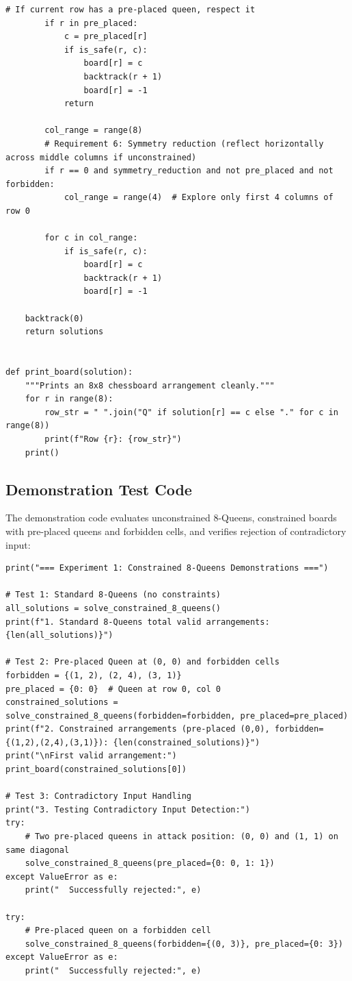 \documentclass[12pt]{article}
\begin{document}
\begin{lstlisting}[style=code]
        # If current row has a pre-placed queen, respect it
        if r in pre_placed:
            c = pre_placed[r]
            if is_safe(r, c):
                board[r] = c
                backtrack(r + 1)
                board[r] = -1
            return

        col_range = range(8)
        # Requirement 6: Symmetry reduction (reflect horizontally across middle columns if unconstrained)
        if r == 0 and symmetry_reduction and not pre_placed and not forbidden:
            col_range = range(4)  # Explore only first 4 columns of row 0

        for c in col_range:
            if is_safe(r, c):
                board[r] = c
                backtrack(r + 1)
                board[r] = -1

    backtrack(0)
    return solutions


def print_board(solution):
    """Prints an 8x8 chessboard arrangement cleanly."""
    for r in range(8):
        row_str = " ".join("Q" if solution[r] == c else "." for c in range(8))
        print(f"Row {r}: {row_str}")
    print()\end{lstlisting}

\subsection{Demonstration Test Code}
The demonstration code evaluates unconstrained 8-Queens, constrained boards with pre-placed queens and forbidden cells, and verifies rejection of contradictory input:

\begin{lstlisting}[style=code]
print("=== Experiment 1: Constrained 8-Queens Demonstrations ===")

# Test 1: Standard 8-Queens (no constraints)
all_solutions = solve_constrained_8_queens()
print(f"1. Standard 8-Queens total valid arrangements: {len(all_solutions)}")

# Test 2: Pre-placed Queen at (0, 0) and forbidden cells
forbidden = {(1, 2), (2, 4), (3, 1)}
pre_placed = {0: 0}  # Queen at row 0, col 0
constrained_solutions = solve_constrained_8_queens(forbidden=forbidden, pre_placed=pre_placed)
print(f"2. Constrained arrangements (pre-placed (0,0), forbidden={(1,2),(2,4),(3,1)}): {len(constrained_solutions)}")
print("\nFirst valid arrangement:")
print_board(constrained_solutions[0])

# Test 3: Contradictory Input Handling
print("3. Testing Contradictory Input Detection:")
try:
    # Two pre-placed queens in attack position: (0, 0) and (1, 1) on same diagonal
    solve_constrained_8_queens(pre_placed={0: 0, 1: 1})
except ValueError as e:
    print("  Successfully rejected:", e)

try:
    # Pre-placed queen on a forbidden cell
    solve_constrained_8_queens(forbidden={(0, 3)}, pre_placed={0: 3})
except ValueError as e:
    print("  Successfully rejected:", e)\end{lstlisting}
\end{document}
